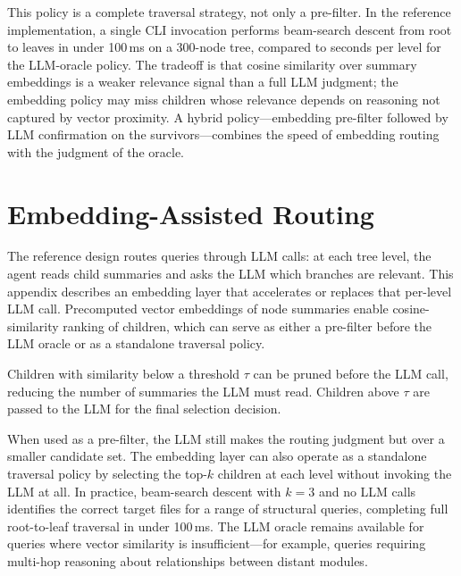 This policy is a complete traversal strategy, not only a pre-filter.
In the reference implementation, a single CLI invocation performs beam-search descent from root to leaves in under 100\,ms on a 300-node tree, compared to seconds per level for the LLM-oracle policy.
The tradeoff is that cosine similarity over summary embeddings is a weaker relevance signal than a full LLM judgment; the embedding policy may miss children whose relevance depends on reasoning not captured by vector proximity.
A hybrid policy---embedding pre-filter followed by LLM confirmation on the survivors---combines the speed of embedding routing with the judgment of the oracle.


\section{Embedding-Assisted Routing}\label{app:embeddings}


The reference design routes queries through LLM calls: at each tree level, the agent reads child summaries and asks the LLM which branches are relevant.
This appendix describes an embedding layer that accelerates or replaces that per-level LLM call.
Precomputed vector embeddings of node summaries enable cosine-similarity ranking of children, which can serve as either a pre-filter before the LLM oracle or as a standalone traversal policy.


Children with similarity below a threshold $\tau$ can be pruned before the LLM call, reducing the number of summaries the LLM must read.
Children above $\tau$ are passed to the LLM for the final selection decision.

When used as a pre-filter, the LLM still makes the routing judgment but over a smaller candidate set.
The embedding layer can also operate as a standalone traversal policy by selecting the top-$k$ children at each level without invoking the LLM at all.
In practice, beam-search descent with $k = 3$ and no LLM calls identifies the correct target files for a range of structural queries, completing full root-to-leaf traversal in under 100\,ms.
The LLM oracle remains available for queries where vector similarity is insufficient---for example, queries requiring multi-hop reasoning about relationships between distant modules.

